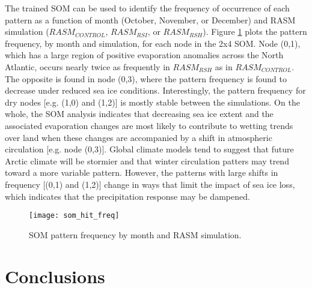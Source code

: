 The trained SOM can be used to identify the frequency of occurrence of each pattern as a function of month (October, November, or December) and RASM simulation ($RASM_{CONTROL}$, $RASM_{RSI}$, or $RASM_{RSH}$).
Figure \ref{fig:som_hit_freq} plots the pattern frequency, by month and simulation, for each node in the 2x4 SOM.
Node (0,1), which has a large region of positive evaporation anomalies across the North Atlantic, occurs nearly twice as frequently in $RASM_{RSH}$ as in $RASM_{CONTROL}$.
The opposite is found in node (0,3), where the pattern frequency is found to decrease under reduced sea ice conditions.
Interestingly, the pattern frequency for dry nodes [e.g. (1,0) and (1,2)] is mostly stable between the simulations.
On the whole, the SOM analysis indicates that decreasing sea ice extent and the associated evaporation changes are most likely to contribute to wetting trends over land when these changes are accompanied by a shift in atmospheric circulation [e.g. node (0,3)].
Global climate models tend to suggest that future Arctic climate will be stormier \citep{Vavrus_2012} and that winter circulation patters may trend toward a more variable pattern.
However, the patterns with large shifts in frequency [(0,1) and (1,2)] change in ways that limit the impact of sea ice loss, which indicates that the precipitation response may be dampened.

\begin{figure}
  \centering
  \texttt{[image: som\_hit\_freq]}
  \caption{SOM pattern frequency by month and RASM simulation.}
  \label{fig:som_hit_freq}
\end{figure}

\section{Conclusions}
\label{sec:conclusions_ch5}

